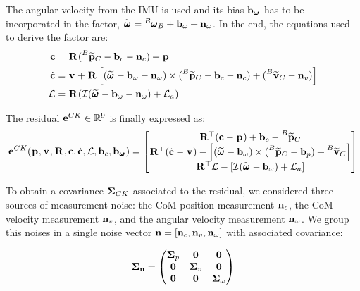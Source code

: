 The angular velocity from the IMU is used and its bias ${\bf b}_{{\bm \omega}}$ has to be incorporated in the factor, $\prescript{}{}{\widetilde{\pmb{\omega}}}_{} = \prescript{B}{}{\pmb{\omega}}_{B} + {\bf b}_{\omega} + {\bf n}_{\omega}$.  
In the end, the equations used to derive the factor are:
%
\begin{equation}
    \begin{split}
    {\bf c} &= \prescript{}{}{{\bf R}}_{} (\prescript{B}{}{\widetilde{{\bf p}}}_{C} -  {\bf b}_{c} - {\bf n}_{c}) + \prescript{}{}{{\bf p}}_{}
    \\
    \dot{{\bf c}} &= 
    \prescript{}{}{{\bf v}}_{} + \prescript{}{}{{\bf R}}_{} \left[ (\prescript{}{}{\widetilde{\pmb{\omega}}}_{} - {\bf b}_{\omega} - {\bf n}_{\omega}) \times (\prescript{B}{}{\widetilde{{\bf p}}}_{C} -  {\bf b}_c - {\bf n}_c) + (\prescript{B}{}{\widetilde{{\bf v}}}_{C} - {\bf n}_{v}) \right]
    \\
    \mathcal{L} &= \prescript{}{}{{\bf R}}_{}(\mathcal{I} (\prescript{}{}{\widetilde{\pmb{\omega}}}_{} - {\bf b}_{\omega} - {\bf n}_{\omega}) + \mathcal{L}_a)
    \end{split}
    \label{eq:ck_with_noise}
\end{equation}

The residual ${\bf e}^{CK} \in \mathbb{R}^9$ is finally expressed as:
%
\begin{equation}
    {\bf e}^{CK}(\prescript{}{}{{\bf p}}_{}, \prescript{}{}{{\bf v}}_{}, \prescript{}{}{{\bf R}}_{}, {\bf c}, \dot{{\bf c}}, \mathcal{L}, {\bf b}_c, {\bf b}_{\prescript{}{}{\pmb{\omega}}_{}})=
    \begin{bmatrix}
        \prescript{}{}{{\bf R}}_{}^{\top}({\bf c} - \prescript{}{}{{\bf p}}_{}) + {\bf b}_{c} - \prescript{B}{}{\widetilde{{\bf p}}}_{C}
        \\
        \prescript{}{}{{\bf R}}_{}^{\top}(\dot{{\bf c}} - \prescript{}{}{{\bf v}}_{}) - \left[(\prescript{}{}{\widetilde{\pmb{\omega}}}_{} - {\bf b}_{\omega}) \times (\prescript{B}{}{\widetilde{{\bf p}}}_{C} -  {\bf b}_{p}) + \prescript{B}{}{\widetilde{{\bf v}}}_{C} \right]
        \\
        \prescript{}{}{{\bf R}}_{}^{\top}\mathcal{L} - \left[\mathcal{I} (\prescript{}{}{\widetilde{\pmb{\omega}}}_{} - {\bf b}_{\omega}) + \mathcal{L}_a \right]
    \end{bmatrix}
    \label{eq:CK_residual}
\end{equation}


To obtain a covariance ${\bm \Sigma}_{CK}$ associated to the residual, we considered three sources of measurement noise: the CoM position measurement ${\bf n}_{c}$, the CoM velocity measurement ${\bf n}_{v}$, 
and the angular velocity measurement ${\bf n}_{\omega}$.
We group this noises in a single noise vector ${\bf n} = [{\bf n}_{c}, {\bf n}_{v}, {\bf n}_{\omega}]$ with associated covariance:

\begin{equation}
    {\bm \Sigma}_{{\bf n}} =
    \begin{pmatrix}
        {\bm \Sigma}_p & \bf0   & \bf0 \\
        \bf0   & {\bm \Sigma}_v & \bf0 \\
        \bf0   & \bf0   & {\bm \Sigma}_{\omega}
    \end{pmatrix}
\end{equation}

